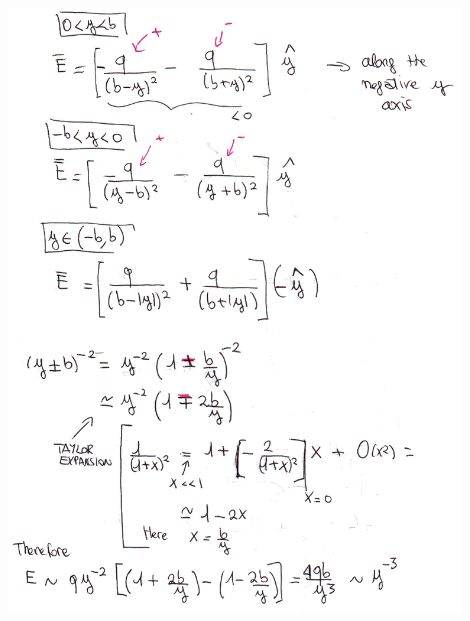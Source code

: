 \documentclass{esg8022pset}
\begin{document}
\begin{solution}
  \begin{center}\includegraphics[width=0.9\textwidth]{ps01_sol_07_2}\end{center}
\end{solution}
\end{document}
